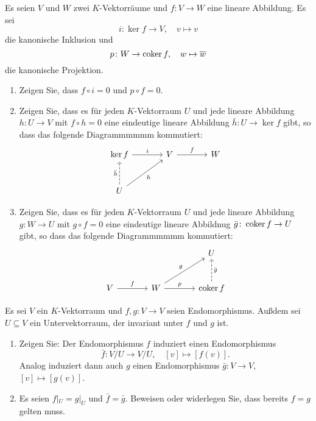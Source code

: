 \begin{question}
  Es seien $V$ und $W$ zwei $K$-Vektorräume und $f \colon V \to W$ eine lineare Abbildung.
  Es sei
  \[
    i \colon \ker f \to V,
    \quad
    v \mapsto v
  \]
  die kanonische Inklusion und
  \[
    p \colon W \to \operatorname{coker} f,
    \quad
    w \mapsto \overline{w}
  \]
  die kanonische Projektion.
  \begin{enumerate}[leftmargin=*]
    \item
      Zeigen Sie, dass $f \circ i = 0$ und $p \circ f = 0$.
    \item
      Zeigen Sie, dass es für jeden $K$-Vektorraum $U$ und jede lineare Abbildung $h \colon U \to V$ mit $f \circ h = 0$ eine eindeutige lineare Abbildung $\bar{h} \colon U \to \ker f$ gibt, so dass das folgende Diagrammmmmm kommutiert:
      \[
        \begin{tikzcd}[row sep = large, column sep = large, ampersand replacement = \&]
                \ker f  \arrow{r}{i}
            \&  V       \arrow{r}{f}
            \&  W
          \\
                U       \arrow[swap]{ru}{h}
                        \arrow[dashed]{u}{\bar{h}}
            \&  {}
            \&  {}
        \end{tikzcd}
      \]
    \item
      Zeigen Sie, dass es für jeden $K$-Vektorraum $U$ und jede lineare Abbildung $g \colon W \to U$ mit $g \circ f = 0$ eine eindeutige lineare Abbildnug $\bar{g} \colon \operatorname{coker} f \to U$ gibt, so dass das folgende Diagrammmmmm kommutiert:
      \[
        \begin{tikzcd}[row sep = large, column sep = large, ampersand replacement = \&]
                {}
            \&  {}
            \&  U
          \\
                V         \arrow{r}{f}
            \&  W         \arrow{r}{p}
                          \arrow{ru}{g}
            \&  \coker f  \arrow[swap, dashed]{u}{\bar{g}}
        \end{tikzcd}
      \]
  \end{enumerate}
\end{question}


\begin{question}
  Es sei $V$ ein $K$-Vektorraum und $f, g \colon V \to V$ seien Endomorphismus.
  Außdem sei $U \subseteq V$ ein Untervektorraum, der invariant unter $f$ und $g$ ist.
  \begin{enumerate}[leftmargin=*]
    \item
      Zeigen Sie: Der Endomorphismus $f$ induziert einen Endomorphismus
      \[
        \bar{f} \colon V\!/U \to V\!/U,
        \quad
        [v] \mapsto [f(v)].
      \]
      Analog induziert dann auch $g$ einen Endomorphismus $\bar{g} \colon V \to V$, $[v] \mapsto [g(v)]$.
    \item
      Es seien $f|_U = g|_U$ und $\bar{f} = \bar{g}$.
      Beweisen oder widerlegen Sie, dass bereits $f = g$ gelten muss.
  \end{enumerate}
\end{question}



